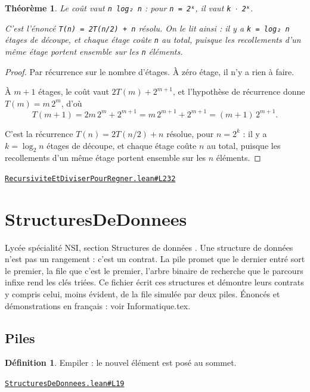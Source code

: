 \documentclass[11pt,a4paper]{article}
\theoremstyle{definition}
\newtheorem{definition}{Définition}
\theoremstyle{plain}
\newtheorem{theoreme}{Théorème}
\newcommand{\source}[2]{\par\smallskip\noindent\hfill{\footnotesize\href{#1}{\texttt{#2}}}\par\smallskip}
\begin{document}
\begin{theoreme}
Le coût vaut \texttt{n log₂ n} : pour \texttt{n = 2ᵏ}, il vaut \texttt{k \(\cdot\) 2ᵏ}.

C'est l'énoncé \texttt{T(n) = 2T(n/2) + n} résolu. On le lit ainsi : il y a \texttt{k = log₂ n}
étages de découpe, et chaque étage coûte \texttt{n} au total, puisque les recollements d'un
même étage portent ensemble sur les \texttt{n} éléments.
\end{theoreme}
\begin{proof}
Par récurrence sur le nombre d'étages. À zéro étage, il n'y a rien à faire.

À \(m+1\) étages, le coût vaut \(2T(m) + 2^{m+1}\), et l'hypothèse de récurrence donne
\(T(m) = m\,2^m\), d'où
\[ T(m+1) = 2m\,2^m + 2^{m+1} = m\,2^{m+1} + 2^{m+1} = (m+1)\,2^{m+1} . \]

C'est la récurrence \(T(n) = 2T(n/2) + n\) résolue, pour \(n = 2^k\) : il y a
\(k = \log_2 n\) étages de découpe, et chaque étage coûte \(n\) au total, puisque les
recollements d'un même étage portent ensemble sur les \(n\) éléments.
\end{proof}
\source{https://github.com/Commutator-IO/learn-lean/blob/main/courses/02-lycee/11-informatique-nsi/RecursiviteEtDiviserPourRegner.lean\#L232}{RecursiviteEtDiviserPourRegner.lean\#L232}

\section{StructuresDeDonnees}

\noindent
Lycée \textemdash{} spécialité NSI, section \og{} Structures de données \fg{}.
Une structure de données n'est pas un rangement : c'est un contrat. La pile promet que
le dernier entré sort le premier, la file que c'est le premier, l'arbre binaire de
recherche que le parcours infixe rend les clés triées. Ce fichier écrit ces structures
et démontre leurs contrats \textemdash{} y compris celui, moins évident, de la file simulée par
deux piles.
Énoncés et démonstrations en français : voir Informatique.tex.

\subsection{Piles}

\begin{definition}
Empiler : le nouvel élément est posé au sommet.
\end{definition}
\source{https://github.com/Commutator-IO/learn-lean/blob/main/courses/02-lycee/11-informatique-nsi/StructuresDeDonnees.lean\#L19}{StructuresDeDonnees.lean\#L19}
\end{document}
